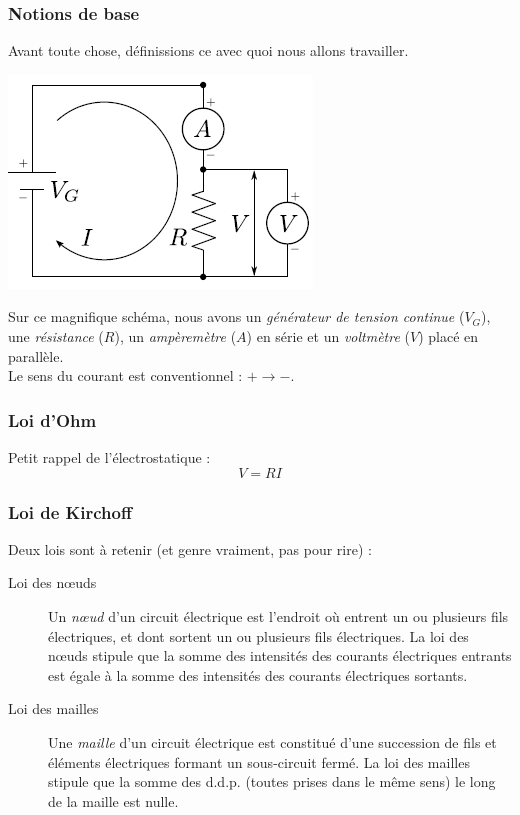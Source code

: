 \documentclass	[11pt, a4paper, openany]{book}
\begin{document}
\subsubsection{Notions de base}
Avant toute chose, définissions ce avec quoi nous allons travailler.
\begin{center}
\includegraphics[scale=0.5]{labo/image8.png}
\end{center}
Sur ce magnifique schéma, nous avons un \textit{générateur de tension continue} ($V_G$), une \textit{résistance} ($R$), un \textit{ampèremètre} ($A$) en série et un \textit{voltmètre} ($V$) placé en parallèle.\\
Le sens du courant est conventionnel : $+ \rightarrow -$.

\subsubsection*{Loi d'Ohm}
Petit rappel de l'électrostatique :
\begin{equation}
V = RI
\end{equation}

\subsubsection*{Loi de Kirchoff}
Deux lois sont à retenir (et genre vraiment, pas pour rire) : 
\begin{description}
\item[Loi des nœuds] Un \textit{nœud} d'un circuit électrique est l'endroit où entrent un ou plusieurs fils électriques, et dont sortent un ou plusieurs fils électriques. La loi des nœuds stipule que la somme des intensités des courants électriques entrants est égale à la somme des intensités des courants électriques sortants.
\item[Loi des mailles] Une \textit{maille} d'un circuit électrique est constitué d'une succession de fils et éléments électriques formant un sous-circuit fermé. La loi des mailles stipule que la somme des d.d.p. (toutes prises dans le même sens) le long de la maille est nulle.
\end{description}
\end{document}

